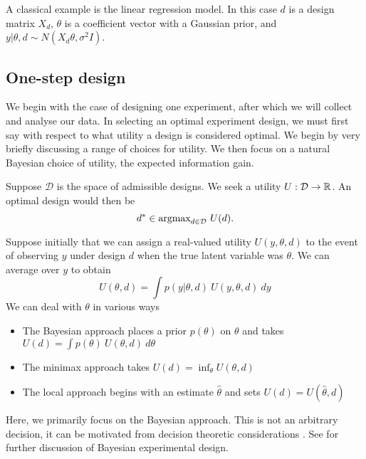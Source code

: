 A classical example is the linear regression model. In this case $d$ is a design matrix $X_d$, $\theta$ is a coefficient vector with a Gaussian prior, and $y|\theta,d \sim N(X_d\theta, \sigma^2 I)$.


\subsection{One-step design}
\label{sec:onestep}
We begin with the case of designing one experiment, after which we will collect and analyse our data. In selecting an optimal experiment design, we must first say with respect to what utility a design is considered optimal. We begin by very briefly discussing a range of choices for utility. We then focus on a natural Bayesian choice of utility, the expected information gain.

Suppose $\mathcal{D}$ is the space of admissible designs. We seek a utility $U: \mathcal{D} \to \mathbb{R}$. An optimal design would then be
\begin{equation}
	d^* \in \text{argmax}_{d \in \mathcal{D}} \ U(d).
\end{equation}

Suppose initially that we can assign a real-valued utility $U(y, \theta, d)$ to the event of observing $y$ under design $d$ when the true latent variable was $\theta$. We can average over $y$ to obtain
\begin{equation}
	U(\theta, d) = \int p(y | \theta, d)\ U(y, \theta, d)\ dy
\end{equation}
We can deal with $\theta$ in various ways
\begin{itemize}
	\item The Bayesian approach \cite{chaloner1995} places a prior $p(\theta)$ on $\theta$ and takes \\ $U(d) = \int p(\theta)\ U(\theta, d)\ d\theta$
	\item The minimax approach \cite{fedorov1972} takes $U(d) = \inf_\theta U(\theta, d)$
	\item The local approach \cite{pronzato2010} begins with an estimate $\hat{\theta}$ and sets $U(d) = U(\hat{\theta}, d)$
\end{itemize}
Here, we primarily focus on the Bayesian approach. This is not an arbitrary decision, it can be motivated from decision theoretic considerations \cite{lindley1972}. See \cite{chaloner1995} for further discussion of Bayesian experimental design.

